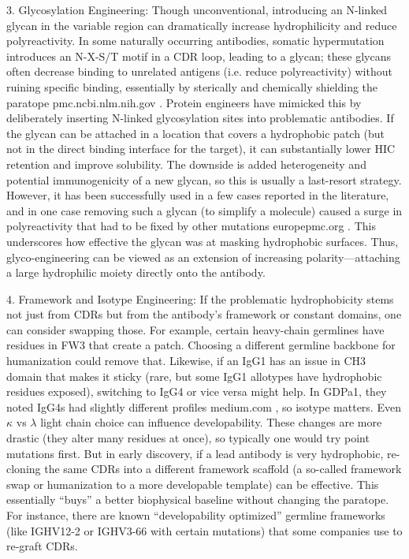 \documentclass[12pt]{article}
\begin{document}
3. Glycosylation Engineering: Though unconventional, introducing an N-linked glycan in the variable region can dramatically increase hydrophilicity and reduce polyreactivity. In some naturally occurring antibodies, somatic hypermutation introduces an N-X-S/T motif in a CDR loop, leading to a glycan; these glycans often decrease binding to unrelated antigens (i.e. reduce polyreactivity) without ruining specific binding, essentially by sterically and chemically shielding the paratope
pmc.ncbi.nlm.nih.gov
. Protein engineers have mimicked this by deliberately inserting N-linked glycosylation sites into problematic antibodies. If the glycan can be attached in a location that covers a hydrophobic patch (but not in the direct binding interface for the target), it can substantially lower HIC retention and improve solubility. The downside is added heterogeneity and potential immunogenicity of a new glycan, so this is usually a last-resort strategy. However, it has been successfully used in a few cases reported in the literature, and in one case removing such a glycan (to simplify a molecule) caused a surge in polyreactivity that had to be fixed by other mutations
europepmc.org
. This underscores how effective the glycan was at masking hydrophobic surfaces. Thus, glyco-engineering can be viewed as an extension of increasing polarity—attaching a large hydrophilic moiety directly onto the antibody.

4. Framework and Isotype Engineering: If the problematic hydrophobicity stems not just from CDRs but from the antibody’s framework or constant domains, one can consider swapping those. For example, certain heavy-chain germlines have residues in FW3 that create a patch. Choosing a different germline backbone for humanization could remove that. Likewise, if an IgG1 has an issue in CH3 domain that makes it sticky (rare, but some IgG1 allotypes have hydrophobic residues exposed), switching to IgG4 or vice versa might help. In GDPa1, they noted IgG4s had slightly different profiles
medium.com
, so isotype matters. Even $\kappa$ vs $\lambda$ light chain choice can influence developability. These changes are more drastic (they alter many residues at once), so typically one would try point mutations first. But in early discovery, if a lead antibody is very hydrophobic, re-cloning the same CDRs into a different framework scaffold (a so-called framework swap or humanization to a more developable template) can be effective. This essentially “buys” a better biophysical baseline without changing the paratope. For instance, there are known “developability optimized” germline frameworks (like IGHV12-2 or IGHV3-66 with certain mutations) that some companies use to re-graft CDRs.
\end{document}

